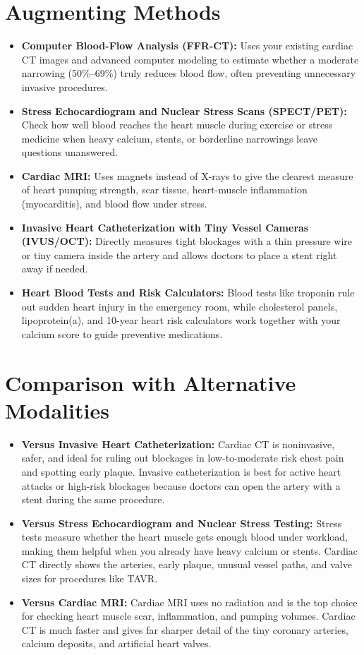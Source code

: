 \section{Augmenting Methods}
\begin{itemize}
    \item \textbf{Computer Blood-Flow Analysis (FFR-CT):} Uses your existing cardiac CT images and advanced computer modeling to estimate whether a moderate narrowing (50\%--69\%) truly reduces blood flow, often preventing unnecessary invasive procedures.
    \item \textbf{Stress Echocardiogram and Nuclear Stress Scans (SPECT/PET):} Check how well blood reaches the heart muscle during exercise or stress medicine when heavy calcium, stents, or borderline narrowings leave questions unanswered.
    \item \textbf{Cardiac MRI:} Uses magnets instead of X-rays to give the clearest measure of heart pumping strength, scar tissue, heart-muscle inflammation (myocarditis), and blood flow under stress.
    \item \textbf{Invasive Heart Catheterization with Tiny Vessel Cameras (IVUS/OCT):} Directly measures tight blockages with a thin pressure wire or tiny camera inside the artery and allows doctors to place a stent right away if needed.
    \item \textbf{Heart Blood Tests and Risk Calculators:} Blood tests like troponin rule out sudden heart injury in the emergency room, while cholesterol panels, lipoprotein(a), and 10-year heart risk calculators work together with your calcium score to guide preventive medications.
\end{itemize}

\section{Comparison with Alternative Modalities}
\begin{itemize}
    \item \textbf{Versus Invasive Heart Catheterization:} Cardiac CT is noninvasive, safer, and ideal for ruling out blockages in low-to-moderate risk chest pain and spotting early plaque. Invasive catheterization is best for active heart attacks or high-risk blockages because doctors can open the artery with a stent during the same procedure.
    \item \textbf{Versus Stress Echocardiogram and Nuclear Stress Testing:} Stress tests measure whether the heart muscle gets enough blood under workload, making them helpful when you already have heavy calcium or stents. Cardiac CT directly shows the arteries, early plaque, unusual vessel paths, and valve sizes for procedures like TAVR.
    \item \textbf{Versus Cardiac MRI:} Cardiac MRI uses no radiation and is the top choice for checking heart muscle scar, inflammation, and pumping volumes. Cardiac CT is much faster and gives far sharper detail of the tiny coronary arteries, calcium deposits, and artificial heart valves.
\end{itemize}

